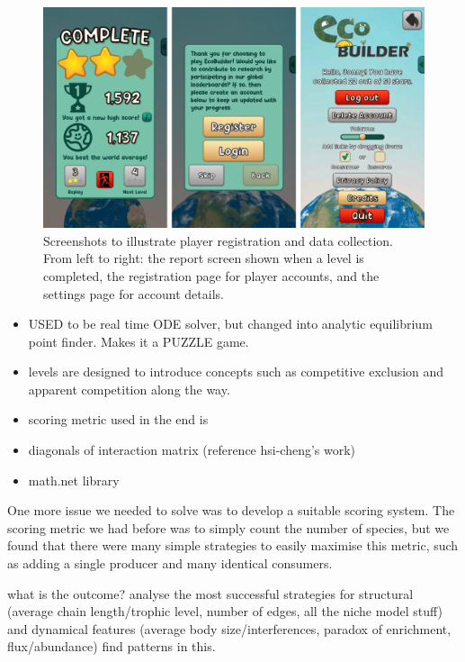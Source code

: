 \begin{figure}
    \centering
    \includegraphics[width=\textwidth]{joy/server.png}
    \caption[Player registration and data collection]{Screenshots to illustrate player registration and data collection. From left to right: the report screen shown when a level is completed, the registration page for player accounts, and the settings page for account details.}
    \label{fig:eco_server}
\end{figure}

\begin{itemize}
  \item USED to be real time ODE solver, but changed into analytic equilibrium point finder. Makes it a PUZZLE game.
  \item levels are designed to introduce concepts such as competitive exclusion and apparent competition along the way.
  \item scoring metric used in the end is 
  \item diagonals of interaction matrix (reference hsi-cheng's work)
  \item math.net library
\end{itemize}

One more issue we needed to solve was to develop a suitable scoring system.
The scoring metric we had before was to simply count the number of species, but we found that there were many simple strategies to easily maximise this metric, such as adding a single producer and many identical consumers.


what is the outcome? analyse the most successful strategies for structural (average chain length/trophic level, number of edges, all the niche model stuff) and dynamical features (average body size/interferences, paradox of enrichment, flux/abundance)
find patterns in this.

